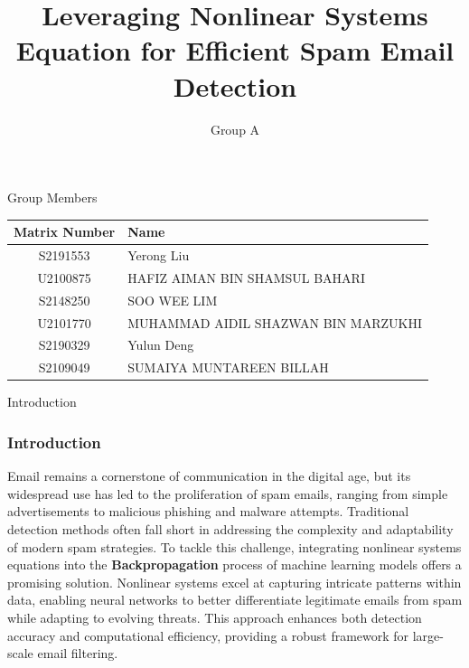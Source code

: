 \documentclass[aspectratio=1610]{beamer}
\title{Leveraging Nonlinear Systems Equation for Efficient Spam Email Detection}
\author{Group A}
\begin{document}
\begin{frame}
\titlepage
\end{frame}

\begin{frame}{Group Members}
    \begin{center}
        \begin{tabular}{|c|l|}
            \hline
            \textbf{Matrix Number} & \textbf{Name} \\
            \hline
            S2191553 & Yerong Liu \\
            \hline
            U2100875 & HAFIZ AIMAN BIN SHAMSUL BAHARI \\
            \hline
            S2148250 & SOO WEE LIM \\
            \hline
            U2101770 & MUHAMMAD AIDIL SHAZWAN BIN MARZUKHI \\
            \hline
            S2190329 & Yulun Deng \\
            \hline
            S2109049 & SUMAIYA MUNTAREEN BILLAH \\
            \hline
        \end{tabular}
    \end{center}
\end{frame}






\begin{frame}{Introduction}
    \frametitle{Introduction}
    \setlength{\baselineskip}{1.5em}
    Email remains a cornerstone of communication in the digital age, but its widespread use has led to the proliferation of spam emails, ranging from simple advertisements to malicious phishing and malware attempts. Traditional detection methods often fall short in addressing the complexity and adaptability of modern spam strategies. To tackle this challenge, integrating nonlinear systems equations into the \textbf{Backpropagation} process of machine learning models offers a promising solution. Nonlinear systems excel at capturing intricate patterns within data, enabling neural networks to better differentiate legitimate emails from spam while adapting to evolving threats. This approach enhances both detection accuracy and computational efficiency, providing a robust framework for large-scale email filtering.

\end{frame}
\end{document}
